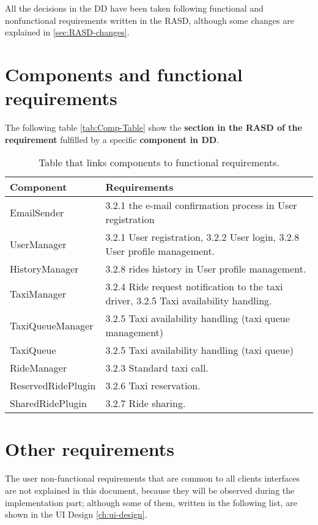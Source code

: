 All the decisions in the DD have been taken following functional and nonfunctional requirements written in the RASD, although some changes are explained in \autoref{sec:RASD-changes}.

\section{Components and functional requirements}

The following table \autoref{tab:Comp-Table} show the {\bf section in the RASD of the requirement} fulfilled by a specific {\bf component in DD}. 


\begin{table}[h]
\begin{center}
\begin{tabular}{|p{}|p{}|}
\hline
{\bf Component}  & {\bf Requirements}\\
\hline
EmailSender & 3.2.1 the e-mail confirmation process in User registration \\
\hline
UserManager & 3.2.1 User registration, 3.2.2 User login, 3.2.8 User profile management.\\
\hline
HistoryManager & 3.2.8 rides history in User profile management.\\
\hline
TaxiManager & 3.2.4 Ride request notification to the taxi driver, 3.2.5 Taxi availability handling.\\
\hline
TaxiQueueManager & 3.2.5 Taxi availability handling (taxi queue management) \\
\hline
TaxiQueue & 3.2.5 Taxi availability handling (taxi queue)\\
\hline
RideManager & 3.2.3 Standard taxi call.\\
\hline 
ReservedRidePlugin & 3.2.6 Taxi reservation.\\
\hline
SharedRidePlugin & 3.2.7 Ride sharing.\\
\hline
\end{tabular}
\caption{Table that links components to functional requirements.}
\label{tab:Comp-Table}
\end{center}
\end{table}

\section{Other requirements}


The user non-functional requirements that are common to all clients interfaces are not explained in this document, because they will be observed during the implementation part; although some of them, written in the following list, are shown in the UI Design \autoref{ch:ui-design}.

